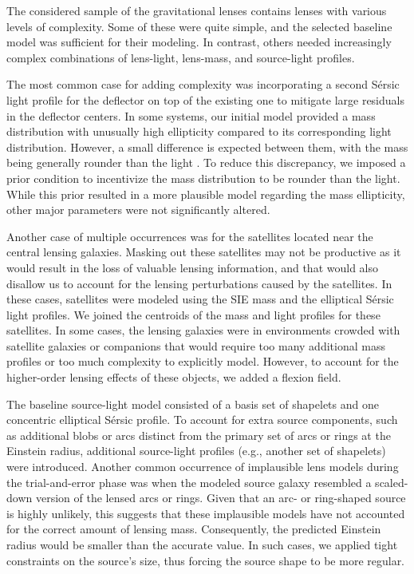 \documentclass{aa}
\begin{document}
The considered sample of the gravitational lenses contains lenses with various levels of complexity. Some of these were quite simple, and the selected baseline model was sufficient for their modeling. In contrast, others needed increasingly complex combinations of lens-light, lens-mass, and source-light profiles. 

The most common case for adding complexity was incorporating a second S\'ersic light profile for the deflector on top of the existing one to mitigate large residuals in the deflector centers. In some systems, our initial model provided a mass distribution with unusually high ellipticity compared to its corresponding light distribution. However, a small difference is expected between them, with the mass being generally rounder than the light \citep[e.g.,][]{bib3:Schmidt23, Sheu24}. To reduce this discrepancy, we imposed a prior condition to incentivize the mass distribution to be rounder than the light. While this prior resulted in a more plausible model regarding the mass ellipticity, other major parameters were not significantly altered.

Another case of multiple occurrences was for the satellites located near the central lensing galaxies. Masking out these satellites may not be productive as it would result in the loss of valuable lensing information, and that would also disallow us to account for the lensing perturbations caused by the satellites. In these cases, satellites were modeled using the SIE mass and the elliptical S\'ersic light profiles. We joined the centroids of the mass and light profiles for these satellites. In some cases, the lensing galaxies were in environments crowded with satellite galaxies or companions that would require too many additional mass profiles or too much complexity to explicitly model. However, to account for the higher-order lensing effects of these objects, we added a flexion field.

The baseline source-light model consisted of a basis set of shapelets and one concentric elliptical S\'ersic profile. To account for extra source components, such as additional blobs or arcs distinct from the primary set of arcs or rings at the Einstein radius, additional source-light profiles (e.g., another set of shapelets) were introduced. Another common occurrence of implausible lens models during the trial-and-error phase was when the modeled source galaxy resembled a scaled-down version of the lensed arcs or rings. Given that an arc- or ring-shaped source is highly unlikely, this suggests that these implausible models have not accounted for the correct amount of lensing mass. Consequently, the predicted Einstein radius would be smaller than the accurate value. In such cases, we applied tight constraints on the source's size, thus forcing the source shape to be more regular.
\end{document}
